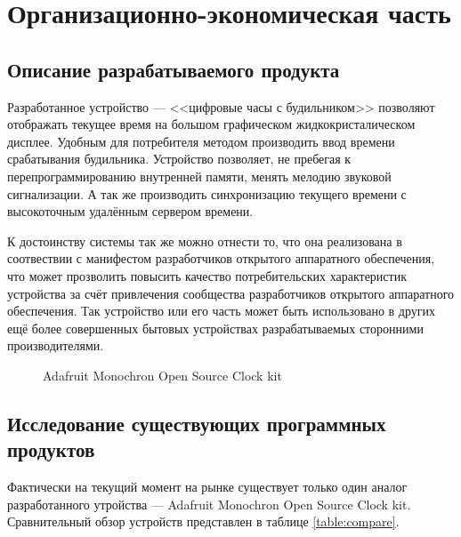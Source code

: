 \section{Организационно-экономическая часть}

\subsection{Описание разрабатываемого продукта}
\begin{par}
Разработанное устройство --- <<цифровые часы с будильником>> позволяют отображать
текущее время на большом графическом жидкокристалическом дисплее. Удобным для
потребителя методом производить ввод времени срабатывания будильника.
Устройство позволяет, не пребегая к перепрограммированию внутренней памяти, менять
мелодию звуковой сигнализации. А так же производить синхронизацию текущего времени
с высокоточным удалённым сервером времени.
\end{par}

\begin{par}
К достоинству системы так же можно отнести то, что она реализована в соотвествии с манифестом
разработчиков открытого аппаратного обеспечения, что может прозволить повысить качество потребительских
характеристик устройства за счёт привлечения сообщества разработчиков открытого аппаратного
обеспечения. Так устройство или его часть может быть использовано в других ещё более
совершенных бытовых устройствах разрабатываемых сторонними производителями.

\begin{figure}[h]
	\caption{Adafruit Monochron Open Source Clock kit}
	\label{img:adafruit}
\end{figure}

\end{par}

\subsection{Исследование существующих программных продуктов}
\begin{par}
Фактически на текущий момент на рынке существует только один аналог разработанного
утройства ---  Adafruit Monochron Open Source Clock kit.
Сравнительный обзор устройств представлен в таблице \ref{table:compare}.
\end{par}


